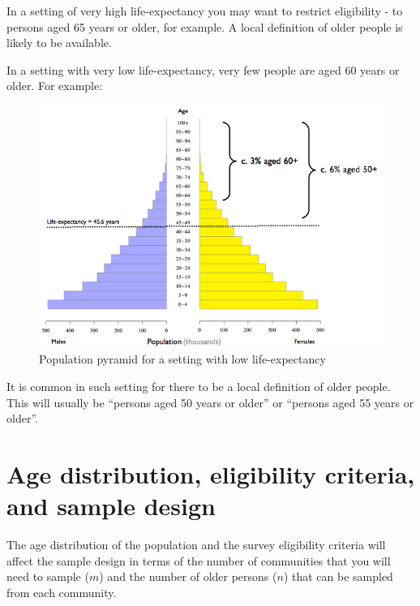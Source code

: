 \documentclass[12pt,a4paper]{book}
\theoremstyle{definition}
\theoremstyle{definition}
\theoremstyle{definition}
\theoremstyle{remark}
\begin{document}
In a setting of very high life-expectancy you may want to restrict
eligibility - to persons aged 65 years or older, for example. A local
definition of older people is likely to be available.

In a setting with very low life-expectancy, very few people are aged 60
years or older. For example:

\begin{figure}[H]

{\centering \includegraphics[width=8.38in]{figures/popPyramid2} 

}

\caption{Population pyramid for a setting with low life-expectancy}\label{fig:sample3}
\end{figure}

It is common in such setting for there to be a local definition of older
people. This will usually be ``persons aged 50 years or older'' or
``persons aged 55 years or older''.

\hypertarget{age-distribution-eligibility-criteria-and-sample-design}{%
\section{Age distribution, eligibility criteria, and sample
design}\label{age-distribution-eligibility-criteria-and-sample-design}}

The age distribution of the population and the survey eligibility
criteria will affect the sample design in terms of the number of
communities that you will need to sample (\(m\)) and the number of older
persons (\(n\)) that can be sampled from each community.
\end{document}
